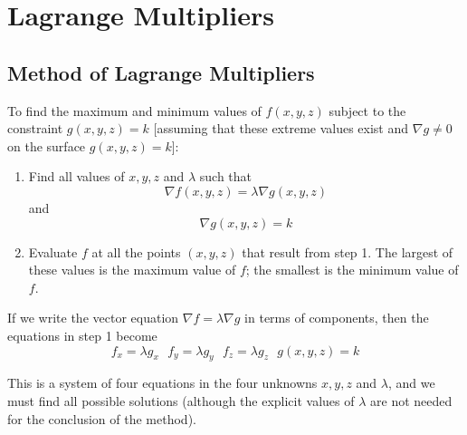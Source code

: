 \chapter{Lagrange Multipliers}

\section{Method of Lagrange Multipliers}

\begin{theorem}
    To find the maximum and minimum values of $f(x, y, z)$ subject to the constraint $g(x, y, z) = k$ [assuming that these extreme values exist and $\nabla g \neq 0$ on the surface $g(x, y, z)=k$]:
    \begin{enumerate}
        \item Find all values of $x, y, z$ and $ \lambda $ such that
            \begin{equation}
                \label{eq: Lagrange Multipliers}
                \nabla f(x, y, z) = \lambda \nabla g(x, y, z)
            \end{equation}
            and
            \begin{equation}
                \label{eq: Lagrange Multipliers}
                \nabla g(x, y, z) = k
            \end{equation}
        \item Evaluate $f$ at all the points $(x, y, z)$ that result from step 1. The largest of these values is the maximum value of $f$; the smallest is the minimum value of $f$.
    \end{enumerate}
\end{theorem}

\begin{flushleft}
    If we write the vector equation $\nabla f = \lambda \nabla g$ in terms of components, then the equations in step 1 become
    \begin{equation}
        \label{eq: Lagrange Multipliers}
        f_x = \lambda g_x \ \ \ f_y=\lambda g_y \ \ \ f_z=\lambda g_z \ \ \ g(x, y, z) = k
    \end{equation}
\end{flushleft}

\begin{flushleft}
    This is a system of four equations in the four unknowns $x, y, z$ and $\lambda$, and we must find all possible solutions (although the explicit values of $\lambda$ are not needed for the conclusion of the method).
\end{flushleft}

